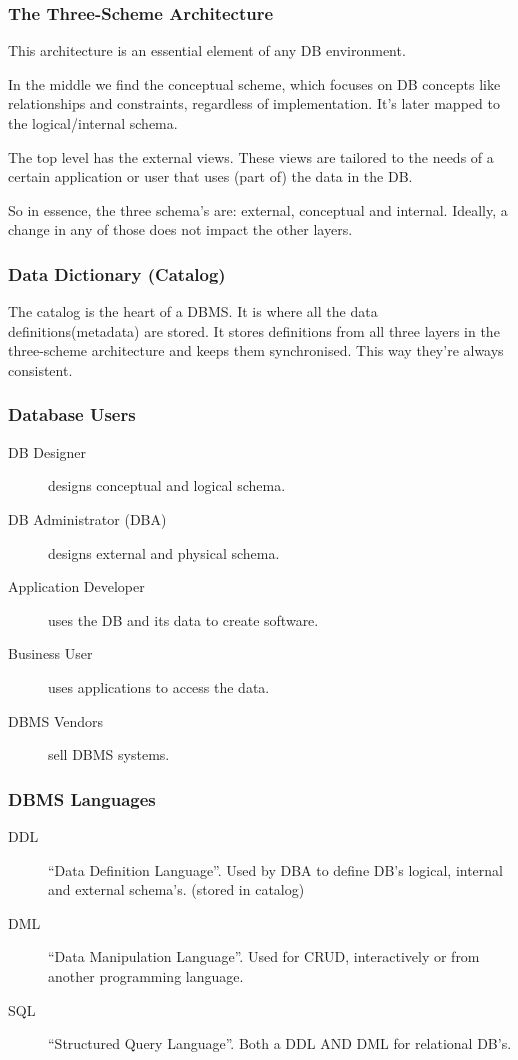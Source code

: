\subsubsection{The Three-Scheme Architecture}
This architecture is an essential element of any DB environment.

In the middle we find the conceptual scheme, which focuses on DB concepts like relationships and constraints, regardless of implementation. It's later mapped to the logical/internal schema. 

The top level has the external views. These views are tailored to the needs of a certain application or user that uses (part of) the data in the DB.

So in essence, the three schema's are: external, conceptual and internal. Ideally, a change in any of those does not impact the other layers.

\subsubsection{Data Dictionary (Catalog)}
The catalog is the heart of a DBMS. It is where all the data definitions(metadata) are stored. It stores definitions from all three layers in the three-scheme architecture and keeps them synchronised. This way they're always consistent.

\subsubsection{Database Users}
\begin{description}
  \item[DB Designer] designs conceptual and logical schema.
  \item[DB Administrator (DBA)] designs external and physical schema.
  \item[Application Developer] uses the DB and its data to create software.
  \item[Business User] uses applications to access the data.
  \item[DBMS Vendors] sell DBMS systems.
\end{description}

\subsubsection{DBMS Languages}
\begin{description}
  \item[DDL] ``Data Definition Language''. Used by DBA to define DB's logical, internal and external schema's. (stored in catalog)
  \item[DML] ``Data Manipulation Language''. Used for CRUD, interactively or from another programming language.
  \item[SQL] ``Structured Query Language''. Both a DDL AND DML for relational DB's.
\end{description}

